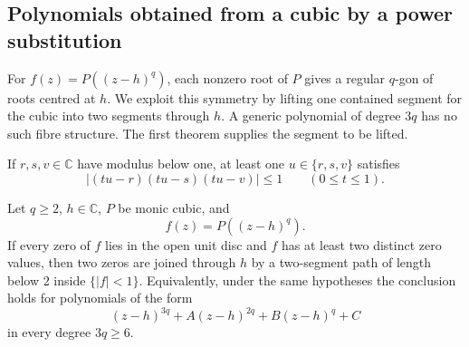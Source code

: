 \documentclass[11pt]{article}
\begin{document}
\subsection{Polynomials obtained from a cubic by a power substitution}
\label{subsec:translated-cubic-quotient-fibres}

For $f(z)=P((z-h)^q)$, each nonzero root of $P$ gives a regular
$q$-gon of roots centred at $h$. We exploit this symmetry by lifting
one contained segment for the cubic into two segments through $h$.
A generic polynomial of degree $3q$ has no such fibre structure.
The first theorem supplies the segment to be lifted.

\begin{theorem}
\label{lem:cubic-safe-root-spoke}
If $r,s,v\in\mathbb C$ have modulus below one, at least one
$u\in\{r,s,v\}$ satisfies
\[
 \left|(tu-r)(tu-s)(tu-v)\right|\le1
 \qquad(0\le t\le1).
\]
\end{theorem}

\begin{theorem}
\label{thm:translated-cubic-quotient-fibres}
Let $q\ge2$, $h\in\mathbb C$, $P$ be monic cubic, and
\[
 f(z)=P((z-h)^q).
\]
If every zero of $f$ lies in the open unit disc and $f$ has at least two
distinct zero values, then two zeros are joined through $h$ by a two-segment
path of length below $2$ inside $\{|f|<1\}$. Equivalently, under the same
hypotheses the conclusion holds for polynomials of the form
\[
 (z-h)^{3q}+A(z-h)^{2q}+B(z-h)^q+C
\]
in every degree $3q\ge6$.
\end{theorem}
\end{document}
